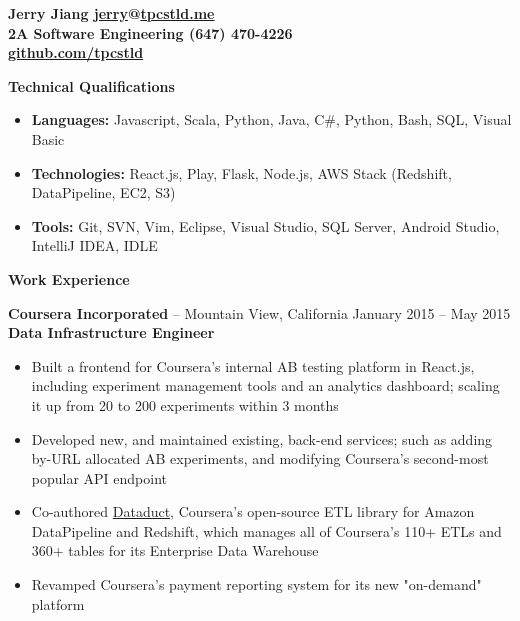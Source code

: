 \documentclass{letter}
\begin{document}
  \thispagestyle{empty}


{\bfseries
  {\Large Jerry Jiang} \hfill \href{mailto:jerry@tpcstld.me}{jerry}@\href{//tpcstld.me}{tpcstld.me} \\
  2A Software Engineering \hfill (647) 470-4226 \\
  \null \hfill \href{https://github.com/tpcstld}{github.com/tpcstld}} \\
\null \hrulefill

{\bfseries \Large Technical Qualifications}
\vspace{-3mm}
\begin{itemize}
    \item {\bfseries Languages:}
        Javascript, Scala, Python, Java, C\#, Python, Bash, SQL, Visual Basic
    \item {\bfseries Technologies:}
        React.js, Play, Flask, Node.js, AWS Stack (Redshift, DataPipeline, EC2, S3)
    \item {\bfseries Tools:}
        Git, SVN, Vim, Eclipse, Visual Studio, SQL Server, Android Studio, IntelliJ IDEA, IDLE
\end{itemize}

{\bfseries \Large Work Experience}

\vspace{-1.5mm}
{\bfseries Coursera Incorporated} -- Mountain View, California \hfill January 2015 -- May 2015 \\
{\bfseries Data Infrastructure Engineer}
\vspace{-3mm}
\begin{itemize}
    \item Built a frontend for Coursera's internal AB testing platform in React.js, including
      experiment management tools and an analytics dashboard; scaling it up from 20 to
      200 experiments within 3 months
    \item Developed new, and maintained existing, back-end services; such as adding by-URL allocated
      AB experiments, and modifying Coursera's second-most popular API endpoint
    \item Co-authored \href{https://github.com/coursera/dataduct}{Dataduct},
      Coursera's open-source ETL library for Amazon DataPipeline and
      Redshift, which manages all of Coursera's 110+ ETLs and 360+ tables for its Enterprise Data Warehouse
    \item Revamped Coursera's payment reporting system for its new "on-demand" platform
\end{itemize}
\end{document}
